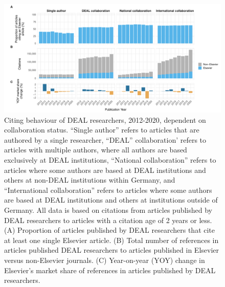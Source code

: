 \documentclass[
]{article}
\begin{document}
\begin{figure}

{\centering \includegraphics{analysis_files/figure-latex/references-publisher-year-collaboration-1} 

}

\caption{Citing behaviour of DEAL researchers, 2012-2020, dependent on collaboration status. ``Single author'' refers to articles that are authored by a single researcher, ``DEAL'' collaboration' refers to articles with multiple authors, where all authors are based exclusively at DEAL institutions, ``National collaboration'' refers to articles where some authors are based at DEAL institutions and others at non-DEAL institutions within Germany, and ``International collaboration'' refers to articles where some authors are based at DEAL institutions and others at institutions outside of Germany. All data is based on citations from articles published by DEAL researchers to articles with a citation age of 2 years or less. (A) Proportion of articles published by DEAL researchers that cite at least one single Elsevier article. (B) Total number of references in articles published DEAL researchers to articles published in Elsevier versus non-Elsevier journals. (C) Year-on-year (YOY) change in Elsevier's market share of references in articles published by DEAL researchers.}\label{fig:references-publisher-year-collaboration}
\end{figure}
\end{document}
